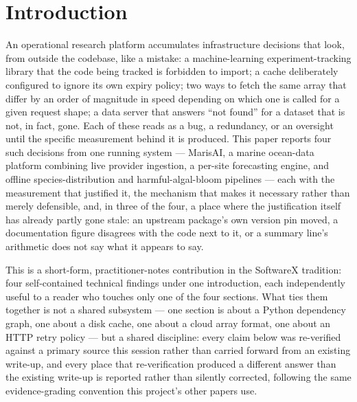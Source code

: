 %

\section{Introduction}

An operational research platform accumulates infrastructure decisions that
look, from outside the codebase, like a mistake: a machine-learning
experiment-tracking library that the code being tracked is forbidden to
import; a cache deliberately configured to ignore its own expiry policy; two
ways to fetch the same array that differ by an order of magnitude in speed
depending on which one is called for a given request shape; a data server
that answers ``not found'' for a dataset that is not, in fact, gone. Each of
these reads as a bug, a redundancy, or an oversight until the specific
measurement behind it is produced. This paper reports four such decisions
from one running system --- MarisAI, a marine ocean-data platform combining
live provider ingestion, a per-site forecasting engine, and offline
species-distribution and harmful-algal-bloom pipelines --- each with the
measurement that justified it, the mechanism that makes it necessary rather
than merely defensible, and, in three of the four, a place where the
justification itself has already partly gone stale: an upstream package's
own version pin moved, a documentation figure disagrees with the code next
to it, or a summary line's arithmetic does not say what it appears to say.

This is a short-form, practitioner-notes contribution in the SoftwareX
tradition: four self-contained technical findings under one introduction,
each independently useful to a reader who touches only one of the four
sections. What ties them together is not a shared subsystem --- one section
is about a Python dependency graph, one about a disk cache, one about a
cloud array format, one about an HTTP retry policy --- but a shared
discipline: every claim below was re-verified against a primary source this
session rather than carried forward from an existing write-up, and every
place that re-verification produced a different answer than the existing
write-up is reported rather than silently corrected, following the same
evidence-grading convention this project's other papers use.

